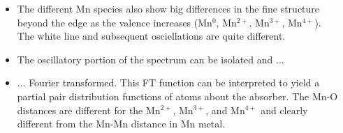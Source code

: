 \documentclass[10pt, xcolor=x11names, compress]{beamer}
\begin{document}
\begin{frame}
\begin{columns}[T]
\begin{column}{0.34\linewidth}
    \end{column}
    \begin{column}{0.66\linewidth}
      \begin{itemize}[<+->]
      \item The different Mn species also show big differences in the
        fine structure beyond the edge as the valence increases
        ({\color{Blue3}Mn$^0$}, \alert{Mn$^{2+}$},
        {\color{Green4}Mn$^{3+}$}, {\color{Purple3}Mn$^{4+}$}).  The
        white line and subsequent osciellations are quite
        different.\\[3ex]
      \item The oscillatory portion of the spectrum can be isolated
        and ...\\[3ex]
      \item ... Fourier transformed.  This FT function can be
        interpreted to yield a partial pair distribution functions of
        atoms about the absorber.  The Mn-O distances are different
        for the \alert{Mn$^{2+}$}, {\color{Green4}Mn$^{3+}$}, and
        {\color{Purple3}Mn$^{4+}$} and clearly different from the
        Mn-Mn distance in {\color{Blue3}Mn metal}.
      \end{itemize}
    \end{column}
  \end{columns}
\end{frame}
\end{document}
